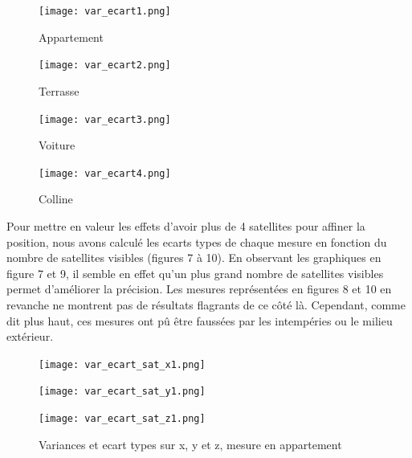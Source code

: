 \documentclass[a4paper,12pt]{article}
\begin{document}
\begin{figure}[ht!] 
  \label{ fig3} 
  \begin{minipage}[b]{0.5\linewidth}
    \centering
    \texttt{[image: var\_ecart1.png]} 
    \caption{Appartement} 
    \vspace{4ex}
  \end{minipage}%
  \begin{minipage}[b]{0.5\linewidth}
    \centering
    \texttt{[image: var\_ecart2.png]} 
    \caption{Terrasse} 
    \vspace{4ex}
  \end{minipage} 
  \begin{minipage}[b]{0.5\linewidth}
    \centering
    \texttt{[image: var\_ecart3.png]} 
    \caption{Voiture} 
    \vspace{4ex}
  \end{minipage}%
  \begin{minipage}[b]{0.5\linewidth}
    \centering
    \texttt{[image: var\_ecart4.png]} 
    \caption{Colline} 
    \vspace{4ex}
  \end{minipage} 
\end{figure}

\newpage

Pour mettre en valeur les effets d'avoir plus de 4 satellites pour affiner la position, nous avons calculé les ecarts types de chaque mesure en fonction du nombre de satellites visibles (figures 7 à 10). En observant les graphiques en figure 7 et 9, il semble en effet qu'un plus grand nombre de satellites visibles permet d'améliorer la précision. Les mesures représentées en figures 8 et 10 en revanche ne montrent pas de résultats flagrants de ce côté là. Cependant, comme dit plus haut, ces mesures ont pû être faussées par les intempéries ou le milieu extérieur.

\begin{figure}[htbp] 
  \label{ fig3} 
  \begin{minipage}[b]{0.5\linewidth}
    \centering
    \texttt{[image: var\_ecart\_sat\_x1.png]} 
    
    \vspace{4ex}
  \end{minipage}%
  \begin{minipage}[b]{0.5\linewidth}
    \centering
    \texttt{[image: var\_ecart\_sat\_y1.png]} 
    \vspace{4ex}
  \end{minipage} 
  \begin{minipage}[b]{0.5\linewidth}
    \centering
    \texttt{[image: var\_ecart\_sat\_z1.png]} 
    \vspace{4ex}
  \end{minipage}%
   \caption{Variances et ecart types sur x, y et z, mesure en appartement} 
\end{figure}
\end{document}
